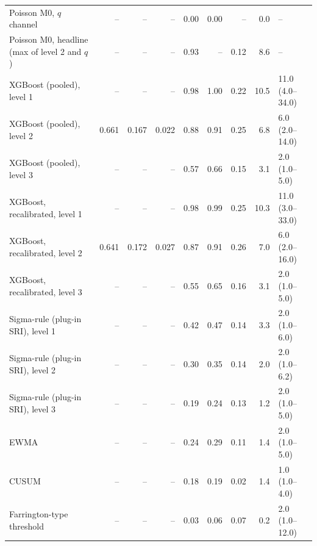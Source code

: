 \begin{minipage}{\linewidth}
\begin{tabular}{lrrrrrrrl}
Poisson M0, $q$ channel & -- & -- & -- & 0.00 & 0.00 & -- & 0.0 & -- \\
Poisson M0, headline (max of level 2 and $q$) & -- & -- & -- & 0.93 & -- & 0.12 & 8.6 & -- \\
XGBoost (pooled), level 1 & -- & -- & -- & 0.98 & 1.00 & 0.22 & 10.5 & 11.0 (4.0--34.0) \\
XGBoost (pooled), level 2 & 0.661 & 0.167 & 0.022 & 0.88 & 0.91 & 0.25 & 6.8 & 6.0 (2.0--14.0) \\
XGBoost (pooled), level 3 & -- & -- & -- & 0.57 & 0.66 & 0.15 & 3.1 & 2.0 (1.0--5.0) \\
XGBoost, recalibrated, level 1 & -- & -- & -- & 0.98 & 0.99 & 0.25 & 10.3 & 11.0 (3.0--33.0) \\
XGBoost, recalibrated, level 2 & 0.641 & 0.172 & 0.027 & 0.87 & 0.91 & 0.26 & 7.0 & 6.0 (2.0--16.0) \\
XGBoost, recalibrated, level 3 & -- & -- & -- & 0.55 & 0.65 & 0.16 & 3.1 & 2.0 (1.0--5.0) \\
Sigma-rule (plug-in SRI), level 1 & -- & -- & -- & 0.42 & 0.47 & 0.14 & 3.3 & 2.0 (1.0--6.0) \\
Sigma-rule (plug-in SRI), level 2 & -- & -- & -- & 0.30 & 0.35 & 0.14 & 2.0 & 2.0 (1.0--6.2) \\
Sigma-rule (plug-in SRI), level 3 & -- & -- & -- & 0.19 & 0.24 & 0.13 & 1.2 & 2.0 (1.0--5.0) \\
EWMA & -- & -- & -- & 0.24 & 0.29 & 0.11 & 1.4 & 2.0 (1.0--5.0) \\
CUSUM & -- & -- & -- & 0.18 & 0.19 & 0.02 & 1.4 & 1.0 (1.0--4.0) \\
Farrington-type threshold & -- & -- & -- & 0.03 & 0.06 & 0.07 & 0.2 & 2.0 (1.0--12.0) \\
\bottomrule
\end{tabular}
\end{minipage}
\vspace{14pt}

